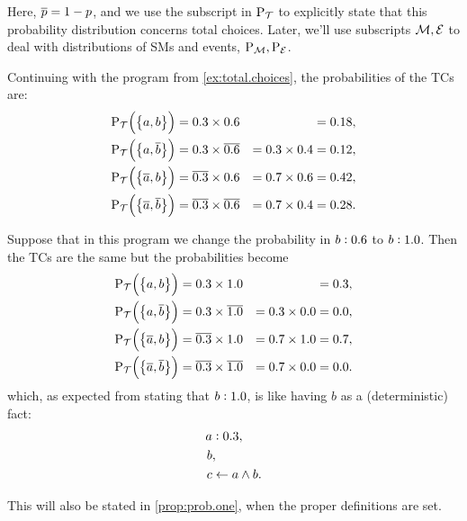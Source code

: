 \documentclass[x11names]{tlp}
\begin{document}
Here, $\overline{p} = 1 - p$, and we use the subscript in $\prT$ to explicitly
state that this probability distribution concerns total choices. Later, we'll
use subscripts $\MODELset, \EVENTSset$ to deal with distributions of
\aclp{SM} and events, $\prM, \prE$.

\ifExamples
	\begin{example}%
		\label{ex:probability.total.choices}
		\em

		Continuing with the program from \cref{ex:total.choices}, the probabilities
		of the \aclp{TC} are:
		\begin{equation*}
			\begin{aligned}
				\prT\at{\set[1]{a, b}}           & = 0.3 \times 0.6           &                  & = 0.18, %
				\\
				\prT\at{\set[1]{a, \co{b}}}      & = 0.3 \times \co{0.6}      & = 0.3 \times 0.4 & = 0.12, %
				\\
				\prT\at{\set[1]{\co{a}, b}}      & = \co{0.3} \times 0.6      & = 0.7 \times 0.6 & = 0.42, %
				\\
				\prT\at{\set[1]{\co{a}, \co{b}}} & = \co{0.3} \times \co{0.6} & = 0.7 \times 0.4 & = 0.28.
			\end{aligned}
		\end{equation*}

		Suppose that in this program we change the probability in $b:0.6$
		to $b:1.0$. Then the \aclp{TC} are the same but the probabilities
		become
		\begin{equation*}
			\begin{aligned}
				\prT\at{\set[1]{a, b}}           & = 0.3 \times 1.0           &                  & = 0.3, %
				\\
				\prT\at{\set[1]{a, \co{b}}}      & = 0.3 \times \co{1.0}      & = 0.3 \times 0.0 & = 0.0, %
				\\
				\prT\at{\set[1]{\co{a}, b}}      & = \co{0.3} \times 1.0      & = 0.7 \times 1.0 & = 0.7, %
				\\
				\prT\at{\set[1]{\co{a}, \co{b}}} & = \co{0.3} \times \co{1.0} & = 0.7 \times 0.0 & = 0.0.
			\end{aligned}
		\end{equation*}
		which, as expected from stating that $b:1.0$, is like
		having $b$ as a (deterministic) fact:
		\begin{equation*}
			\begin{split}
				\probfact{a & }{0.3},             %
				\\
				b           & ,                   %
				\\
				c           & \clause a \wedge b.
			\end{split}
		\end{equation*}

		This will also be stated in \cref{prop:prob.one}, when the proper definitions
		are set.
	\end{example}
\fi
\end{document}
